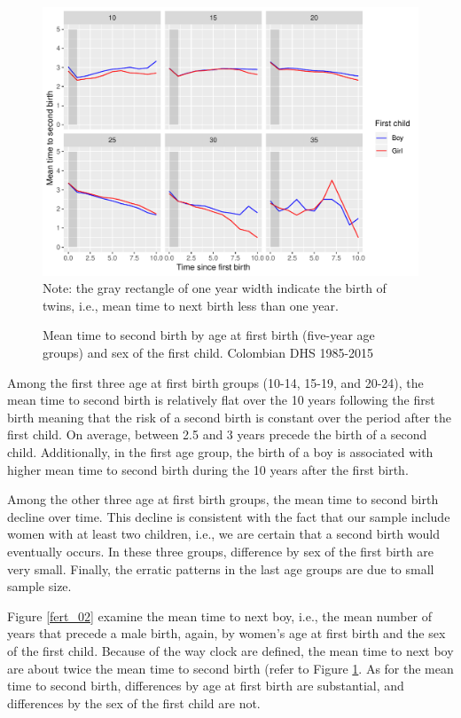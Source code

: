 \documentclass{article}
\begin{document}
\begin{figure}[H]
\centering
\caption{Mean time to second birth by age at first birth (five-year age groups) and sex of the first child. Colombian DHS 1985-2015}
    \includegraphics[scale=0.8]{Spells/Figures/mt_second_birth_by_sex_first.pdf}\\
    \label{fert_01}
    Note: the gray rectangle of one year width indicate the birth of twins, i.e., mean time to next birth less than one year.
\end{figure}

Among the first three age at first birth groups (10-14, 15-19, and 20-24), the mean time to second birth is relatively flat over the 10 years following the first birth meaning that the risk of a second birth is constant over the period after the first child. On average, between 2.5 and 3 years precede the birth of a second child. Additionally, in the first age group, the birth of a boy is associated with higher mean time to second birth during the 10 years after the first birth.

Among the other three age at first birth groups, the mean time to second birth decline over time. This decline is consistent with the fact that our sample include women with at least two children, i.e., we are certain that a second birth would eventually occurs. In these three groups, difference by sex of the first birth are very small. Finally, the erratic patterns in the last age groups are due to small sample size.

Figure \ref{fert_02} examine the mean time to next boy, i.e., the mean number of years that precede a male birth, again, by women's age at first birth and the sex of the first child. Because of the way clock are defined, the mean time to next boy are about twice the mean time to second birth (refer to Figure \ref{fert_01}. As for the mean time to second birth, differences by age at first birth are substantial, and differences by the sex of the first child are not.
\end{document}
